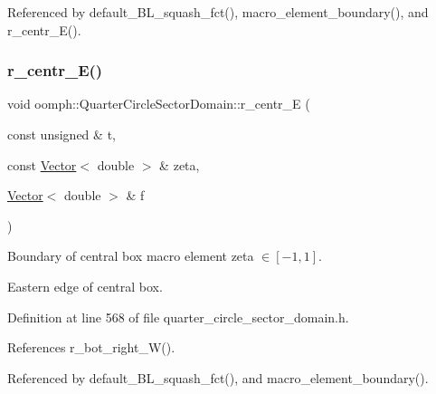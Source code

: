 Referenced by default\+\_\+\+B\+L\+\_\+squash\+\_\+fct(), macro\+\_\+element\+\_\+boundary(), and r\+\_\+centr\+\_\+\+E().

\mbox{\label{classoomph_1_1QuarterCircleSectorDomain_ae4558d37a4f9bb3f9d78b6878cb77a49}} 
\subsubsection{\texorpdfstring{r\+\_\+centr\+\_\+\+E()}{r\_centr\_E()}}
{\footnotesize\ttfamily void oomph\+::\+Quarter\+Circle\+Sector\+Domain\+::r\+\_\+centr\+\_\+E (\begin{DoxyParamCaption}\item[{const unsigned \&}]{t,  }\item[{const \hyperlink{classoomph_1_1Vector}{Vector}$<$ double $>$ \&}]{zeta,  }\item[{\hyperlink{classoomph_1_1Vector}{Vector}$<$ double $>$ \&}]{f }\end{DoxyParamCaption})\hspace{0.3cm}{\ttfamily [private]}}



Boundary of central box macro element zeta $ \in [-1,1] $. 

Eastern edge of central box. 

Definition at line 568 of file quarter\+\_\+circle\+\_\+sector\+\_\+domain.\+h.



References r\+\_\+bot\+\_\+right\+\_\+\+W().



Referenced by default\+\_\+\+B\+L\+\_\+squash\+\_\+fct(), and macro\+\_\+element\+\_\+boundary().

\mbox{\label{classoomph_1_1QuarterCircleSectorDomain_a1cb12e9b1d2e17f8bd5c3d6691be3b1d}} 
